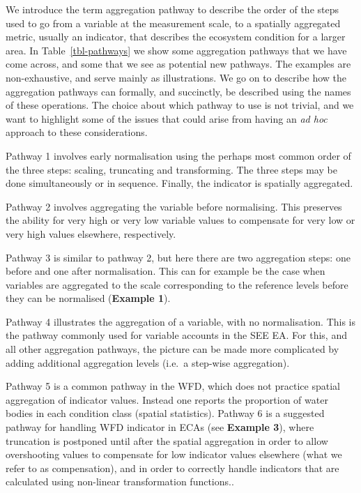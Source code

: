 \documentclass[
  authoryear,
  preprint,
  3p]{elsarticle}
\begin{document}
We introduce the term aggregation pathway to describe the order of the
steps used to go from a variable at the measurement scale, to a
spatially aggregated metric, usually an indicator, that describes the
ecosystem condition for a larger area. In Table~\ref{tbl-pathways} we
show some aggregation pathways that we have come across, and some that
we see as potential new pathways. The examples are non-exhaustive, and
serve mainly as illustrations. We go on to describe how the aggregation
pathways can formally, and succinctly, be described using the names of
these operations. The choice about which pathway to use is not trivial,
and we want to highlight some of the issues that could arise from having
an \emph{ad hoc} approach to these considerations.

Pathway 1 involves early normalisation using the perhaps most common
order of the three steps: scaling, truncating and transforming. The
three steps may be done simultaneously or in sequence. Finally, the
indicator is spatially aggregated.

Pathway 2 involves aggregating the variable before normalising. This
preserves the ability for very high or very low variable values to
compensate for very low or very high values elsewhere, respectively.

Pathway 3 is similar to pathway 2, but here there are two aggregation
steps: one before and one after normalisation. This can for example be
the case when variables are aggregated to the scale corresponding to the
reference levels before they can be normalised (\textbf{Example 1}).

Pathway 4 illustrates the aggregation of a variable, with no
normalisation. This is the pathway commonly used for variable accounts
in the SEE EA. For this, and all other aggregation pathways, the picture
can be made more complicated by adding additional aggregation levels
(i.e.~a step-wise aggregation).

Pathway 5 is a common pathway in the WFD, which does not practice
spatial aggregation of indicator values. Instead one reports the
proportion of water bodies in each condition class (spatial statistics).
Pathway 6 is a suggested pathway for handling WFD indicator in ECAs (see
\textbf{Example 3}), where truncation is postponed until after the
spatial aggregation in order to allow overshooting values to compensate
for low indicator values elsewhere (what we refer to as compensation),
and in order to correctly handle indicators that are calculated using
non-linear transformation functions..
\end{document}
